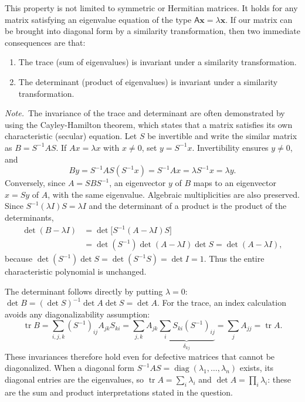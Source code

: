 This property is not limited to symmetric or Hermitian matrices. It holds for
any matrix satisfying an eigenvalue equation of the type
$\mathsf{A}\mathbf{x}=\lambda\mathbf{x}$. If our matrix can be brought into
diagonal form by a similarity transformation, then two immediate consequences
are that:
\begin{enumerate}
\item[1.] The trace (sum of eigenvalues) is invariant under a similarity
  transformation.
\item[2.] The determinant (product of eigenvalues) is invariant under a
  similarity transformation.
\end{enumerate}
\emph{Note.}~The invariance of the trace and determinant are often
demonstrated by using the Cayley-Hamilton theorem, which states that a matrix
satisfies its own characteristic (secular) equation.
\solution
Let $S$ be invertible and write the similar matrix as
$B=S^{-1}AS$. If $Ax=\lambda x$ with $x\ne0$, set $y=S^{-1}x$.
Invertibility ensures $y\ne0$, and
\[
By=S^{-1}AS(S^{-1}x)=S^{-1}Ax
=\lambda S^{-1}x=\lambda y.
\]
Conversely, since $A=SBS^{-1}$, an eigenvector $y$ of $B$ maps to an
eigenvector $x=Sy$ of $A$, with the same eigenvalue. Algebraic
multiplicities are also preserved. Since $S^{-1}(\lambda I)S=\lambda I$
and the determinant of a product is the product of the determinants,
\begin{align*}
\det(B-\lambda I)
&=\det\bigl[S^{-1}(A-\lambda I)S\bigr]\\
&=\det(S^{-1})\det(A-\lambda I)\det S
=\det(A-\lambda I),
\end{align*}
because $\det(S^{-1})\det S=\det(S^{-1}S)=\det I=1$.
Thus the entire characteristic polynomial is unchanged.

The determinant follows directly by putting $\lambda=0$:
$\det B=(\det S)^{-1}\det A\det S=\det A$.
For the trace, an index calculation avoids any diagonalizability
assumption:
\[
\operatorname{tr}B
=\sum_{i,j,k}(S^{-1})_{ij}A_{jk}S_{ki}
=\sum_{j,k}A_{jk}\underbrace{\sum_iS_{ki}(S^{-1})_{ij}}_{\delta_{kj}}
=\sum_jA_{jj}=\operatorname{tr}A.
\]
These invariances therefore hold even for defective matrices that
cannot be diagonalized. When a diagonal form
$S^{-1}AS=\operatorname{diag}(\lambda_1,\ldots,\lambda_n)$ exists, its
diagonal entries are the eigenvalues, so
$\operatorname{tr}A=\sum_i\lambda_i$ and $\det A=\prod_i\lambda_i$:
these are the sum and product interpretations stated in the question.

